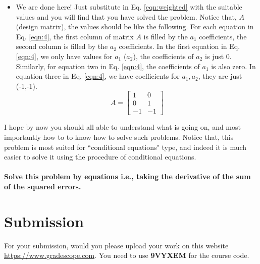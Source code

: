 \documentclass[]{scrartcl}
\begin{document}
\begin{itemize}
\begin{equation}
		\end{equation}
		\item We are done here! Just substitute in Eq. \eqref{eqn:weighted} with the suitable values and you will find that you have solved the problem. Notice that, $A$ (design matrix), the values should be like the following. For each equation in Eq. \eqref{eqn:4}, the first column of matrix $A$ is filled by the $a_1$ coefficients, the second column is filled by the $a_2$ coefficients. In the first equation in Eq. \eqref{eqn:4}, we only have values for $a_1$ ($a_2$), the coefficients of $a_2$ is just 0. Similarly, for equation two in Eq. \eqref{eqn:4}, the coefficients of $a_1$ is also zero. In equation three in Eq. \eqref{eqn:4}, we have coefficients for $a_1, a_2$, they are just (-1,-1).
		\begin{equation}
		A = 
		\begin{bmatrix}
		1 & 0\\
		0 & 1\\
		-1 & -1
		\end{bmatrix}
		\end{equation}
\end{itemize}


I hope by now you should all able to understand what is going on, and most importantly how to to know how to solve such problems. Notice that, this problem is most suited for ``conditional equations" type, and indeed it is much easier to solve it using the procedure of conditional equations.
\\
\paragraph{Solve this problem by equations i.e., taking the derivative of the sum of the squared errors.}

\section{Submission}
For your submission, would you please upload your work on this website \href{https://www.gradescope.com}{https://www.gradescope.com}. You need to use \textbf{9VYXEM} for the course code.
\end{document}
